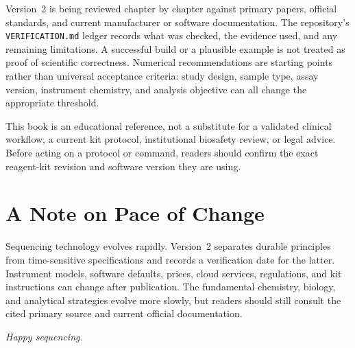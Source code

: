 Version~2 is being reviewed chapter by chapter against primary papers, official standards, and current manufacturer or software documentation. The repository's \texttt{VERIFICATION.md} ledger records what was checked, the evidence used, and any remaining limitations. A successful build or a plausible example is not treated as proof of scientific correctness. Numerical recommendations are starting points rather than universal acceptance criteria: study design, sample type, assay version, instrument chemistry, and analysis objective can all change the appropriate threshold.

This book is an educational reference, not a substitute for a validated clinical workflow, a current kit protocol, institutional biosafety review, or legal advice. Before acting on a protocol or command, readers should confirm the exact reagent-kit revision and software version they are using.

\section*{A Note on Pace of Change}

Sequencing technology evolves rapidly. Version~2 separates durable principles from time-sensitive specifications and records a verification date for the latter. Instrument models, software defaults, prices, cloud services, regulations, and kit instructions can change after publication. The fundamental chemistry, biology, and analytical strategies evolve more slowly, but readers should still consult the cited primary source and current official documentation.

\vspace{1cm}
\noindent\textit{Happy sequencing.}

